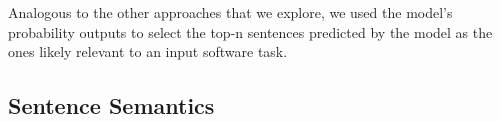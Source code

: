 Analogous to the other approaches that we explore, we used the model's probability outputs to select 
the top-n sentences predicted by the model as the ones likely relevant to an input software task.




















\subsection{Sentence Semantics}



\clearpage


